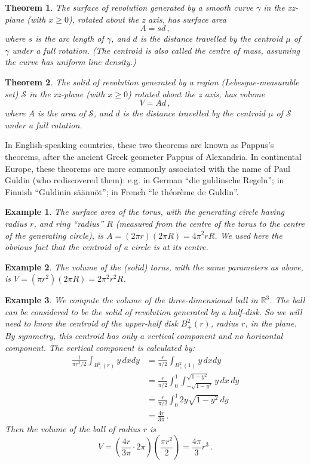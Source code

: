\documentclass[12pt]{article}
\newcommand{\real}{\mathbb{R}}
\newtheorem{thm}{Theorem}
\newtheorem{ex}{Example}
\begin{document}
\begin{thm}
The surface of revolution generated by a smooth curve $\gamma$
in the xz-plane (with $x \geq 0$), rotated about the z axis,
has surface area
\[
A = sd\,,
\]
where $s$ is the arc length of $\gamma$, and $d$ is the distance travelled
by the centroid $\mu$ of $\gamma$ under a full rotation.
(The centroid is also called the centre of mass, assuming the curve
has uniform line density.)
\end{thm}

\begin{thm}
The solid of revolution generated by a region (Lebesgue-measurable set) $\mathcal{S}$ in the xz-plane (with $x \geq 0$)
rotated about the z axis,
has volume
\[
V = Ad\,,
\]
where $A$ is the area of $\mathcal{S}$, and $d$ is the distance travelled by the centroid
$\mu$ of $\mathcal{S}$ under a full rotation.  
\end{thm}

In English-speaking countries, these two theorems are known as Pappus's theorems,
after the ancient Greek geometer Pappus of Alexandria.
In continental Europe, these theorems are more commonly associated with the name of 
Paul Guldin (who rediscovered them):
e.g. in German ``die guldinsche Regeln''; in Finnish ``Guldinin s\"a\"ann\"ot'';
in French ``le th\'eor\`eme de Guldin''.

\bigskip

\begin{ex}
The surface area of the torus,
with the generating circle having radius $r$, and ring ``radius'' $R$ (measured from the centre of the torus to the centre of the generating circle),
is $A = (2\pi r)(2\pi R) = 4\pi^2 rR$.
We used here the obvious fact that the centroid of a circle is at its centre.
\end{ex}

\begin{ex}
The volume of the (solid) torus, with the same parameters as above, is $V = (\pi r^2) (2\pi R) = 2\pi^2 r^2 R$.
\end{ex}

\begin{ex}
We compute the volume of the three-dimensional ball in $\real^3$.
The ball can be considered to be the solid of revolution generated
by a half-disk. 
So we will need to know the centroid of the upper-half disk $B^2_+(r)$, radius $r$, in the plane.
By symmetry, this centroid has only a vertical component and no horizontal component.
The vertical component is calculated by:
\begin{align*}
\frac{1}{\pi r^2/2} \int_{B^2_+(r)} y \, dx dy &= 
\frac{r}{\pi/2} \int_{B^2_+(1)} y \, dx dy \\
&= 
\frac{r}{\pi/2} \int_0^1 \int_{-\sqrt{1-y^2}}^{\sqrt{1-y^2}} y \, dx \, dy \\
&=
\frac{r}{\pi/2} \int_0^1 2y \sqrt{1-y^2} \, dy \\
&=
\frac{4r}{3\pi}\,.
\end{align*}
Then the volume of the ball of radius $r$ is
\[
V = \left(\frac{4r}{3\pi} \cdot 2 \pi\right) \left( \frac{\pi r^2}{2} \right) = \frac{4\pi}{3} r^3\,.
\]
\end{ex}
\end{document}

